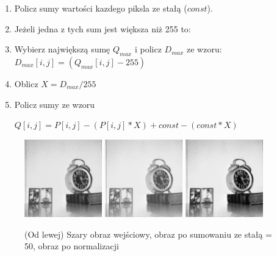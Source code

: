 \documentclass[final,a4paper,openany,12pt]{mwbk}
\begin{document}
	\begin{enumerate}	
		\item Policz sumy wartości kazdego piksla ze stałą ($const$).
		\item Jeżeli jedna z tych sum jest większa niż 255 to:
		\item Wybierz największą sumę  $Q_{max}$ i policz $D_{max}$ ze wzoru: $D_{max}[i,j] = (Q_{max}[i,j] - 255)$ 
		\item Oblicz $X = D_{max} / 255$
		\item Policz sumy ze wzoru
		\begin{center}$Q[i,j] = P[i,j] - (P[i,j]* X) + const - (const * X) $ \\

		\end{center}
	\end{enumerate}

\begin{figure}[H]
	\begin{center}
		\includegraphics[width=0.3\textwidth]{1/1Gray_Const_Sum_Original}
		\includegraphics[width=0.3\textwidth]{1/1Gray_Const_Sum_Result}
		\includegraphics[width=0.3\textwidth]{1/1Gray_Const_Sum_Result_Norm}
	\end{center}
	\caption{(Od lewej) Szary obraz wejściowy, obraz po sumowaniu ze stałą = 50, obraz po normalizacji }
\end{figure}
\end{document}
